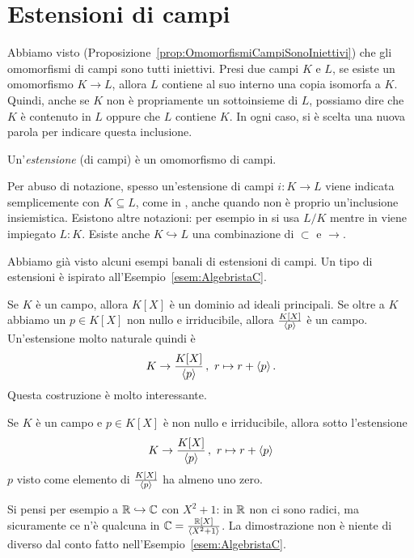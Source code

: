 \section{Estensioni di campi}

Abbiamo visto (Proposizione~\ref{prop:OmomorfismiCampiSonoIniettivi}) che gli omomorfismi di campi sono tutti iniettivi. Presi due campi $K$ e $L$, se esiste un omomorfismo $K \to L$, allora $L$ contiene al suo interno una copia isomorfa a $K$. Quindi, anche se $K$ non è propriamente un sottoinsieme di $L$, possiamo dire che $K$ è contenuto in $L$ oppure che $L$ contiene $K$. In ogni caso, si è scelta una nuova parola per indicare questa inclusione.

\begin{defi}
Un'{\em estensione} (di campi) è un omomorfismo di campi.
\end{defi}

Per abuso di notazione, spesso un'estensione di campi $i : K \to L$ viene indicata semplicemente con $K \subseteq L$, come in \cite{aluffi:algebra}, anche quando non è proprio un'inclusione insiemistica. Esistono altre notazioni: per esempio in \cite{milne:fields} si usa $L/K$ mentre in \cite{leinster:fields} viene impiegato $L:K$. Esiste anche $K \hookrightarrow L$ una combinazione di $\subset$ e $\to$.

Abbiamo già visto alcuni esempi banali di estensioni di campi. Un tipo di estensioni è ispirato all'Esempio~\ref{esem:AlgebristaC}.

\begin{cons}
Se $K$ è un campo, allora $K[X]$ è un dominio ad ideali principali. Se oltre a $K$ abbiamo un $p \in K[X]$ non nullo e irriducibile, allora $\frac{K[X]}{\left\langle p\right\rangle}$ è un campo. Un'estensione molto naturale quindi è
\[K \to \frac{K[X]}{\left\langle p\right\rangle}\,,\ r \mapsto r + \left\langle p\right\rangle .\]
Questa costruzione è molto interessante.
\end{cons}

\begin{prop}
Se $K$ è un campo e $p \in K[X]$ è non nullo e irriducibile, allora sotto l'estensione
\[K \to \frac{K[X]}{\left\langle p\right\rangle}\,,\ r \mapsto r + \left\langle p\right\rangle \]
$p$ visto come elemento di $\frac{K[X]}{\left\langle p\right\rangle}$ ha almeno uno zero.
\end{prop}

Si pensi per esempio a $\mathbb{R} \hookrightarrow \mathbb{C}$ con $X^2+1$: in $\mathbb{R}$ non ci sono radici, ma sicuramente ce n'è qualcuna in $\mathbb{C} = \frac{\mathbb{R}[X]}{\left\langle X^2+1\right\rangle}$. La dimostrazione non è niente di diverso dal conto fatto nell'Esempio~\ref{esem:AlgebristaC}.

